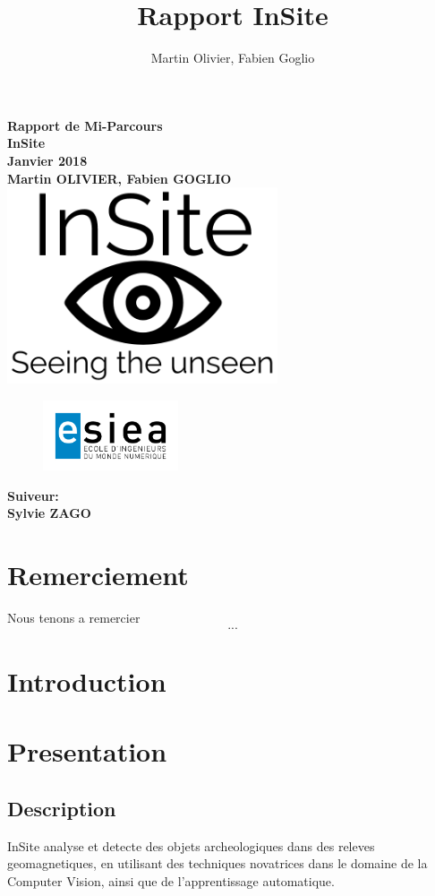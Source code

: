 \documentclass[a4paper, 12pt, titlepage, oneside]{article}
\author{Martin Olivier, Fabien Goglio}
\title{Rapport InSite}
\begin{document}
\begin{titlepage}
	\centering
		\vfill
		    {\bfseries\Large
			Rapport de Mi-Parcours\\
			InSite\\
			Janvier 2018\\
			\vskip2cm
			Martin OLIVIER, Fabien GOGLIO\\
		    }    
		\vfill
		\includegraphics[width=8cm]{Logo_Preview.png} %
		\begin{figure}[b]
			\includegraphics[width=4cm]{Logo-ESIEA.jpg} %

		\end{figure}
		\vfill
		\hfill {\bfseries\Large
		 Suiveur:\\
		 \hfill Sylvie ZAGO}
\end{titlepage}

\newpage
	\tableofcontents
\newpage
\cleardoublepage
{}
\section{Remerciement}
	Nous tenons a remercier \[...\]
	\newpage
\section{Introduction}
	\newpage
\section{Presentation}
	\subsection{Description}
		InSite analyse et detecte des objets archeologiques dans des releves geomagnetiques, en utilisant des techniques novatrices dans le domaine de
		la Computer Vision, ainsi que de l'apprentissage automatique.
\end{document}
